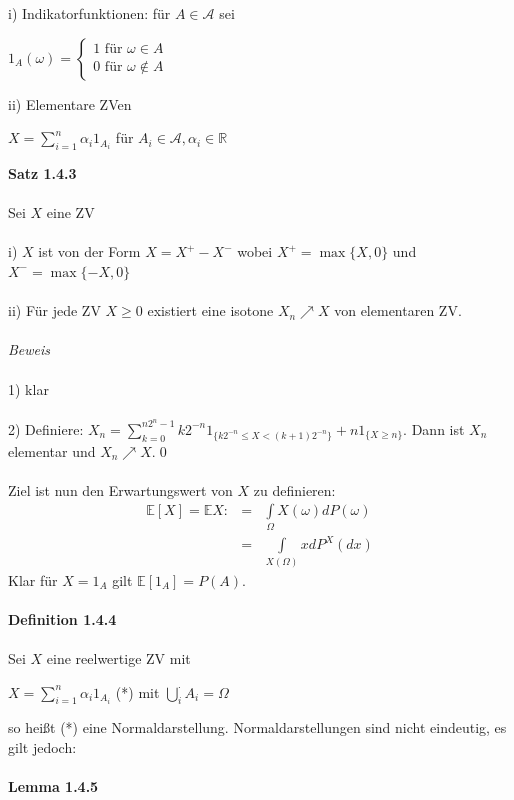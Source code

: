 \documentclass[10pt,a4paper]{report}
\numberwithin{equation}{section}
\numberwithin{figure}{section}
\theoremstyle{plain}
\theoremstyle{definition}
\theoremstyle{plain}
\theoremstyle{definition}
\theoremstyle{remark}
\theoremstyle{plain}
\theoremstyle{plain}
\theoremstyle{plain}
\newcommand{\1}{ \mathbb{1} } %
\begin{document}
i) Indikatorfunktionen: für $A \in \mathcal{A}$ sei
\begin{center}
$1_A(\omega)=
\begin{cases}
1 \text{ für } \omega \in A\\
0 \text{ für } \omega \notin A
\end{cases}$
\end{center}
ii) Elementare ZVen
\begin{center}
$X=\sum\limits_{i=1}^n \alpha_i 1_{A_i}$ für $A_i \in \mathcal{A}, \alpha_i \in \mathbb{R}$
\end{center}
\textbf{Satz 1.4.3}\\\\
Sei $X$ eine ZV\\\\
i) $X$ ist von der Form $X=X^+-X^-$ wobei $X^+=\max\{X,0\}$ und $X^-=\max\{-X,0\}$\\\\
ii) Für jede ZV $X\geq0$ existiert eine isotone $X_n \nearrow X$ von elementaren ZV.\\\\
\textit{Beweis}\\\\
1) klar\\\\
2) Definiere: $X_n=\sum\limits_{k=0}^{n2^n-1}k2^{-n}1_{\{k2^{-n}\leq X < (k+1)2^{-n}\}}+n1_{\{X\geq n\}}$. Dann ist $X_n$ elementar und $X_n \nearrow X$.\qed\\\\
Ziel ist nun den Erwartungswert von $X$ zu definieren:
\begin{eqnarray*}
\mathbb{E}[X]=\mathbb{E}X:&=&\int\limits_\Omega X(\omega)dP(\omega)\\
&=&\int\limits_{X(\Omega)}x dP^X(dx)
\end{eqnarray*} 
Klar für $X=1_A$ gilt $\mathbb{E}[1_A]=P(A)$.\\\\
\textbf{Definition 1.4.4}\\\\
Sei $X$ eine reelwertige ZV mit
\begin{center}
$X=\sum\limits_{i=1}^n\alpha_i1_{A_i}$ (*) mit $\bigcup_i^\cdot A_i=\Omega$
\end{center}
so heißt (*) eine Normaldarstellung. Normaldarstellungen sind nicht eindeutig, es gilt jedoch:\\\\
\textbf{Lemma 1.4.5}\\\\
\end{document}
